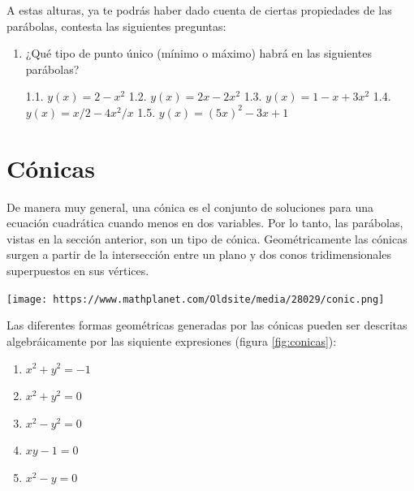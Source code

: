 \documentclass[
]{book}
\providecommand{\tightlist}{%
  \setlength{\itemsep}{0pt}\setlength{\parskip}{0pt}}
\begin{document}
A estas alturas, ya te podrás haber dado cuenta de ciertas propiedades de las parábolas, contesta las siguientes preguntas:

\begin{enumerate}
\def\labelenumi{\arabic{enumi}.}
\item
  ¿Qué tipo de punto único (mínimo o máximo) habrá en las siguientes parábolas?

  1.1. \(y(x) = 2 - x^2\)
  1.2. \(y(x) = 2x - 2x^2\)
  1.3. \(y(x) = 1 - x + 3x^2\)
  1.4. \(y(x) = x/2 - 4x^2/x\)
  1.5. \(y(x) = (5x)^2 - 3x + 1\)
\end{enumerate}

\hypertarget{cuxf3nicas}{%
\section{Cónicas}\label{cuxf3nicas}}

De manera muy general, una cónica es el conjunto de soluciones para una ecuación cuadrática cuando menos en dos variables. Por lo tanto, las parábolas, vistas en la sección anterior, son un tipo de cónica. Geométricamente las cónicas surgen a partir de la intersección entre un plano y dos conos tridimensionales superpuestos en sus vértices.

\texttt{[image: https://www.mathplanet.com/Oldsite/media/28029/conic.png]}

Las diferentes formas geométricas generadas por las cónicas pueden ser descritas algebráicamente por las siquiente expresiones (figura \ref{fig:conicas}):

\begin{enumerate}
\def\labelenumi{\arabic{enumi}.}
\tightlist
\item
  \(x^2 + y^2 = -1\)
\item
  \(x^2 + y^2 = 0\)
\item
  \(x^2 - y^2 = 0\)
\item
  \(xy - 1 = 0\)
\item
  \(x^2 - y = 0\)
\end{enumerate}
\end{document}
